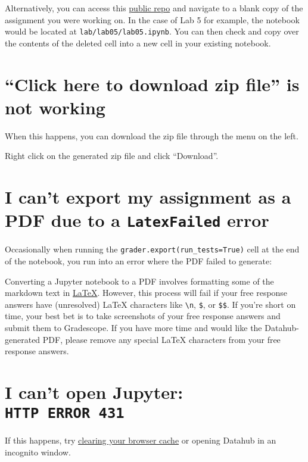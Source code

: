 \documentclass[
  letterpaper,
  DIV=11,
  numbers=noendperiod]{scrreprt}
\begin{document}
Alternatively, you can access this
\href{https://github.com/DS-100/sp24-student}{public repo} and navigate
to a blank copy of the assignment you were working on. In the case of
Lab 5 for example, the notebook would be located at
\texttt{lab/lab05/lab05.ipynb}. You can then check and copy over the
contents of the deleted cell into a new cell in your existing notebook.

\section{``Click here to download zip file'' is not
working}\label{click-here-to-download-zip-file-is-not-working}

When this happens, you can download the zip file through the menu on the
left.

Right click on the generated zip file and click ``Download''.

\section{\texorpdfstring{I can't export my assignment as a PDF due to a
\texttt{LatexFailed}
error}{I can't export my assignment as a PDF due to a LatexFailed error}}\label{i-cant-export-my-assignment-as-a-pdf-due-to-a-latexfailed-error}

Occasionally when running the \texttt{grader.export(run\_tests=True)}
cell at the end of the notebook, you run into an error where the PDF
failed to generate:

Converting a Jupyter notebook to a PDF involves formatting some of the
markdown text in \href{https://www.latex-project.org/}{LaTeX}. However,
this process will fail if your free response answers have (unresolved)
LaTeX characters like \texttt{\textbackslash{}n}, \texttt{\$}, or
\texttt{\$\$}. If you're short on time, your best bet is to take
screenshots of your free response answers and submit them to Gradescope.
If you have more time and would like the Datahub-generated PDF, please
remove any special LaTeX characters from your free response answers.

\section{\texorpdfstring{I can't open Jupyter:
\texttt{HTTP\ ERROR\ 431}}{I can't open Jupyter: HTTP ERROR 431}}\label{i-cant-open-jupyter-http-error-431}

If this happens, try
\href{https://support.google.com/accounts/answer/32050?hl=en&co=GENIE.Platform\%3DDesktop}{clearing
your browser cache} or opening Datahub in an incognito window.
\end{document}
